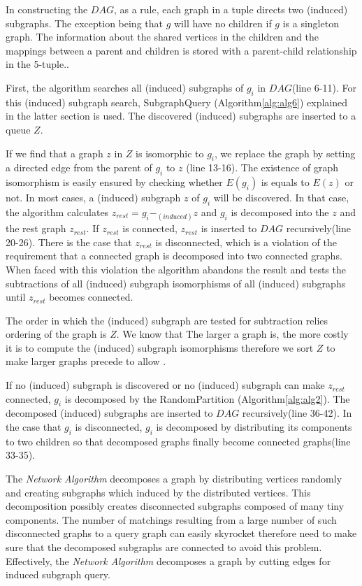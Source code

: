 In constructing the $DAG$, as a rule, each graph in a tuple directs two (induced) subgraphs. The exception being that $g$ will have no children if $g$ is a singleton graph. The information about the shared vertices in the children and the mappings between a parent and children is  stored with a parent-child relationship in the 5-tuple..

First, the algorithm searches all (induced) subgraphs of $g_i$ in $DAG$(line 6-11). For this (induced) subgraph search, SubgraphQuery (Algorithm\ref{alg:alg6}) explained in the latter section is used. The discovered (induced) subgraphs are inserted to a queue $Z$.

If we find that a graph $z$ in $Z$ is isomorphic to $g_i$, we replace the graph by setting a directed edge from the parent of $g_i$ to $z$ (line 13-16).
The existence of graph isomorphism is easily ensured by checking whether $E(g_i)$ is equals to $E(z)$ or not. In most cases, a (induced) subgraph $z$ of $g_i$ will be discovered. In that case, the algorithm calculates $z_{rest} = g_i -_{(induced)} z$ and $g_i$ is decomposed into the $z$ and the rest graph $z_{rest}$.
If $z_{rest}$ is connected, $z_{rest}$ is inserted to $DAG$ recursively(line 20-26).
There is the case that $z_{rest}$ is disconnected, which is a violation of the requirement that a connected graph is decomposed into two connected graphs. When faced with this violation the algorithm abandons the result and tests the subtractions of all (induced) subgraph isomorphisms of all (induced) subgraphs until $z_{rest}$ becomes connected.

The order in which the  (induced) subgraph are tested for subtraction relies ordering of the graph is $Z$.
We know that The larger a graph is, the more costly it is to compute the (induced) subgraph isomorphisms therefore we sort $Z$ to make larger graphs precede to allow  .

If no (induced) subgraph is discovered or no (induced) subgraph can make $z_{rest}$ connected, $g_i$ is decomposed by the RandomPartition (Algorithm\ref{alg:alg2}).
The decomposed (induced) subgraphs are inserted to $DAG$ recursively(line 36-42).
In the case that $g_i$ is disconnected, $g_i$ is decomposed by distributing its components to two children so that decomposed graphs finally become connected graphs(line 33-35).



The \textit{Network Algorithm} decomposes a graph by distributing vertices randomly and creating subgraphs which induced by the distributed vertices.
This decomposition possibly creates disconnected subgraphs composed of many tiny components.
The number of matchings resulting from a large number of such disconnected graphs to a query graph can easily skyrocket therefore need to make sure that the decomposed subgraphs are connected to avoid this problem. Effectively, the \textit{Network Algorithm} decomposes a graph by cutting edges for induced subgraph query.

